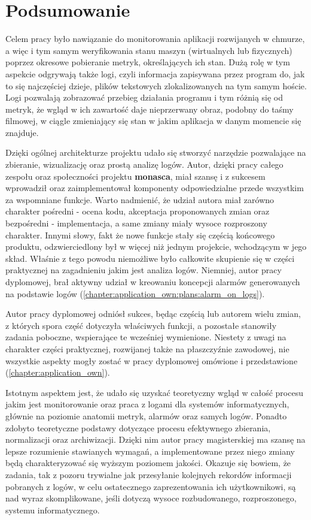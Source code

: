 \chapter[Podsumowanie]{Podsumowanie}
\label{chapter:summary}

Celem pracy było nawiązanie do monitorowania aplikacji
rozwijanych w chmurze, a więc i tym samym weryfikowania stanu maszyn (wirtualnych lub fizycznych) poprzez
okresowe pobieranie metryk, określających ich stan. Dużą rolę w tym aspekcie odgrywają także logi, czyli
informacja zapisywana przez program do, jak to się najczęściej dzieje, plików tekstowych zlokalizowanych
na tym samym hoście. Logi pozwalają zobrazować przebieg działania programu i tym różnią się od metryk, że
wgląd w ich zawartość daje nieprzerwany obraz, podobny do taśmy filmowej, w ciągle zmieniający się stan w jakim
aplikacja w danym momencie się znajduje. 

Dzięki ogólnej architekturze projektu udało się stworzyć narzędzie pozwalające na zbieranie, wizualizację 
oraz prostą analizę logów. Autor, dzięki pracy całego zespołu oraz
społeczności projektu \textbf{monasca}, miał szansę i z sukcesem wprowadził oraz zaimplementował komponenty
odpowiedzialne przede wszystkim za wspomniane funkcje. Warto nadmienić, że udział autora
miał zarówno charakter pośredni - ocena kodu, akceptacja proponowanych zmian oraz bezpośredni - implementacja, a same zmiany
miały wysoce rozproszony charakter. Innymi słowy, fakt że nowe funkcje stały się częścią końcowego produktu, 
odzwierciedlony był w więcej niż jednym projekcie, wchodzącym w jego skład. 
Właśnie z tego powodu niemożliwe było całkowite skupienie się w części praktycznej na zagadnieniu 
jakim jest analiza logów. Niemniej, autor pracy dyplomowej, brał aktywny udział w kreowaniu
koncepcji alarmów generowanych na podstawie logów (\ref{chapter:application_own:plans:alarm_on_logs}).

Autor pracy dyplomowej odniósł sukces, będąc częścią lub autorem wielu zmian, z których spora część dotyczyła
właściwych funkcji, a pozostałe stanowiły zadania poboczne, wspierające te wcześniej wymienione. Niestety z uwagi
na charakter części praktycznej, rozwijanej także na płaszczyźnie zawodowej, 
nie wszystkie aspekty mogły zostać w pracy dyplomowej omówione i przedstawione (\ref{chapter:application_own}). 

Istotnym aspektem jest, że udało się uzyskać teoretyczny wgląd w całość procesu jakim
jest monitorowanie oraz praca z logami dla systemów informatycznych, głównie na poziomie anatomii metryk, alarmów
oraz samych logów. Ponadto zdobyto teoretyczne podstawy dotyczące procesu efektywnego zbierania, normalizacji oraz 
archiwizacji. Dzięki nim autor pracy magisterskiej ma szansę na lepsze rozumienie stawianych
wymagań, a implementowane przez niego zmiany będą charakteryzować się wyższym poziomem jakości. Okazuje się bowiem, że
zadania, tak z pozoru trywialne jak przesyłanie kolejnych rekordów informacji pobranych z logów, w celu ostatecznego
zaprezentowania ich użytkownikowi, są nad wyraz skomplikowane, jeśli dotyczą wysoce rozbudowanego, rozproszonego, systemu 
informatycznego.